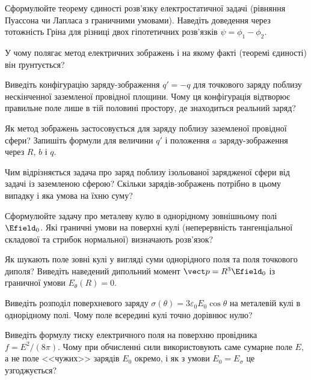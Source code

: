 \begin{Questions}
\begin{quizlist}
	\item Сформулюйте теорему єдиності розв'язку електростатичної задачі (рівняння Пуассона чи Лапласа з граничними умовами). Наведіть доведення через тотожність Гріна для різниці двох гіпотетичних розв'язків $\psi=\phi_1-\phi_2$.
	\item У чому полягає метод електричних зображень і на якому факті (теоремі єдиності) він ґрунтується?
	\item Виведіть конфігурацію заряду-зображення $q'=-q$ для точкового заряду поблизу нескінченної заземленої провідної площини. Чому ця конфігурація відтворює правильне поле лише в тій половині простору, де знаходиться реальний заряд?
	\item Як метод зображень застосовується для заряду поблизу заземленої провідної сфери? Запишіть формули для величини $q'$ і положення $a$ заряду-зображення через $R$, $b$ і $q$.
	\item Чим відрізняється задача про заряд поблизу ізольованої зарядженої сфери від задачі із заземленою сферою? Скільки зарядів-зображень потрібно в цьому випадку і яка умова на їхню суму?
	\item Сформулюйте задачу про металеву кулю в однорідному зовнішньому полі $\Efield_0$. Які граничні умови на поверхні кулі (неперервність тангенціальної складової та стрибок нормальної) визначають розв'язок?
	\item Як шукають поле зовні кулі у вигляді суми однорідного поля та поля точкового диполя? Виведіть наведений дипольний момент $\vect p = R^3\Efield_0$ із граничної умови $E_\theta(R)=0$.
	\item Виведіть розподіл поверхневого заряду $\sigma(\theta) = 3\varepsilon_0 E_0\cos\theta$ на металевій кулі в однорідному полі. Чому поле всередині кулі точно дорівнює нулю?
	\item Виведіть формулу тиску електричного поля на поверхню провідника $f = E^2/(8\pi)$. Чому при обчисленні сили використовують саме сумарне поле $E$, а не поле <<чужих>> зарядів $E_0$ окремо, і як з умови $E_0=E_\sigma$ це узгоджується?
\end{quizlist}
\end{Questions}